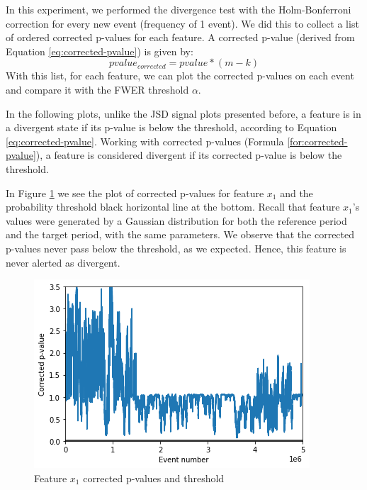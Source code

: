 \documentclass[sigconf]{acmart}
\begin{document}
In this experiment, we performed the divergence test with the Holm-Bonferroni correction for every new event (frequency of 1 event). We did this to collect a list of ordered corrected p-values for each feature. A corrected p-value (derived from Equation \ref{eq:corrected-pvalue}) is given by:
\begin{equation}
    pvalue_{corrected} = pvalue * (m - k)
    \label{for:corrected-pvalue}
\end{equation}
With this list, for each feature, we can plot the corrected p-values on each event and compare it with the FWER threshold $\alpha$.

In the following plots, unlike the JSD signal plots presented before, a feature is in a divergent state if its p-value is below the threshold, according to Equation \ref{eq:corrected-pvalue}. Working with corrected p-values (Formula \ref{for:corrected-pvalue}), a feature is considered divergent if its corrected p-value is below the threshold.

In Figure \ref{fig:x1-corrected-pvalues} we see the plot of corrected p-values for feature $x_1$ and the probability threshold black horizontal line at the bottom. Recall that feature $x_1$'s values were generated by a Gaussian distribution for both the reference period and the target period, with the same parameters. We observe that the corrected p-values never pass below the threshold, as we expected. Hence, this feature is never alerted as divergent.
\begin{figure}[!htb]
    \begin{center}
      \includegraphics[scale=0.5]{figures/x1-corrected-pvalues.png}
      \caption{Feature $x_1$ corrected p-values and threshold}
      \label{fig:x1-corrected-pvalues}
    \end{center}
\end{figure}
\end{document}
